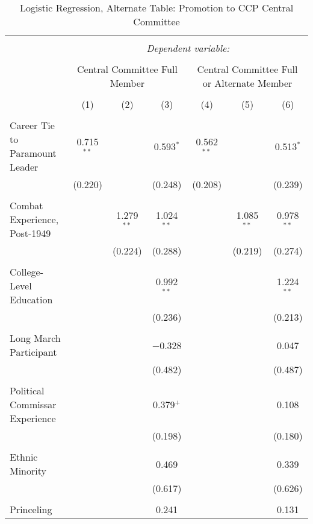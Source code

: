 
\begin{table}[!htbp] \centering 
  \caption{Logistic Regression, Alternate Table: Promotion to CCP Central Committee} 
  \label{table_a9} 
\begin{tabular}{@{\extracolsep{5pt}}lcccccc} 
\\[-1.8ex]\hline 
\hline \\[-1.8ex] 
 & \multicolumn{6}{c}{\textit{Dependent variable:}} \\ 
\cline{2-7} 
\\[-1.8ex] & \multicolumn{3}{c}{Central Committee Full Member} & \multicolumn{3}{c}{Central Committee Full or Alternate Member} \\ 
\\[-1.8ex] & (1) & (2) & (3) & (4) & (5) & (6)\\ 
\hline \\[-1.8ex] 
 Career Tie to Paramount Leader & 0.715$^{**}$ &  & 0.593$^{*}$ & 0.562$^{**}$ &  & 0.513$^{*}$ \\ 
  & (0.220) &  & (0.248) & (0.208) &  & (0.239) \\ 
  & & & & & & \\ 
 Combat Experience, Post-1949 &  & 1.279$^{**}$ & 1.024$^{**}$ &  & 1.085$^{**}$ & 0.978$^{**}$ \\ 
  &  & (0.224) & (0.288) &  & (0.219) & (0.274) \\ 
  & & & & & & \\ 
 College-Level Education &  &  & 0.992$^{**}$ &  &  & 1.224$^{**}$ \\ 
  &  &  & (0.236) &  &  & (0.213) \\ 
  & & & & & & \\ 
 Long March Participant &  &  & $-$0.328 &  &  & 0.047 \\ 
  &  &  & (0.482) &  &  & (0.487) \\ 
  & & & & & & \\ 
 Political Commissar Experience &  &  & 0.379$^{+}$ &  &  & 0.108 \\ 
  &  &  & (0.198) &  &  & (0.180) \\ 
  & & & & & & \\ 
 Ethnic Minority &  &  & 0.469 &  &  & 0.339 \\ 
  &  &  & (0.617) &  &  & (0.626) \\ 
  & & & & & & \\ 
 Princeling &  &  & 0.241 &  &  & 0.131 \\ 

\end{tabular}
\end{table}
